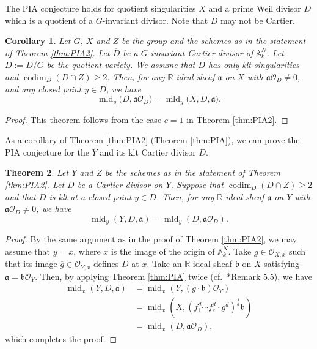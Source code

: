 \documentclass[a4paper,11pt]{amsart}
\newtheorem{thm}{Theorem}[section]
\newtheorem{cor}[thm]{Corollary}
\theoremstyle{definition}
\theoremstyle{remark}
\begin{document}
The PIA conjecture holds for quotient singularities $X$ and a prime Weil divisor $D$ which is a quotient of a $G$-invariant divisor. Note that $D$ may not be Cartier.
\begin{cor}\label{cor:PIA4}
Let $G$, $X$ and $Z$ be the group and the schemes as in the statement of Theorem \ref{thm:PIA2}. 
Let $\overline{D}$ be a $G$-invariant Cartier divisor of $\mathbb{A}_k^N$. 
Let $D := \overline{D}/ G$ be the quotient variety. 
We assume that $D$ has only klt singularities and $\operatorname{codim} _D (D \cap Z) \ge 2$. 
Then, for any $\mathbb{R}$-ideal sheaf $\mathfrak{a}$ on $X$ with $\mathfrak{a} \mathcal{O}_D \not = 0$, and any closed point $y \in D$, we have 
\[
\operatorname{mld}_y \bigl( D, \mathfrak{a}\mathcal{O}_D \bigr) = 
\operatorname{mld}_y \bigl( X, D, \mathfrak{a} \bigr). 
\]
\end{cor}
\begin{proof}
This theorem follows from the case $c = 1$ in Theorem \ref{thm:PIA2}.
\end{proof}

As a corollary of Theorem \ref{thm:PIA2} (Theorem \ref{thm:PIA}), we can prove the PIA conjecture for the $Y$ and its klt Cartier divisor $D$. 

\begin{thm}\label{thm:PIA3}
Let $Y$ and $Z$ be the schemes as in the statement of Theorem \ref{thm:PIA2}. 
Let $D$ be a Cartier divisor on $Y$. 
Suppose that $\operatorname{codim}_D (D \cap Z) \ge 2$ and that $D$ is klt at a closed point $y \in D$. 
Then, for any $\mathbb{R}$-ideal sheaf $\mathfrak{a}$ on $Y$ with $\mathfrak{a} \mathcal{O}_D \not = 0$, we have 
\[
\operatorname{mld}_y \left( Y,D, \mathfrak{a} \right) = 
\operatorname{mld}_y \left( D, \mathfrak{a} \mathcal{O}_D \right). 
\]
\end{thm}
\begin{proof}
By the same argument as in the proof of Theorem \ref{thm:PIA2}, we may assume that $y = x$, where $x$ is the image of the origin of $\mathbb{A}^N _k$. 
Take $g \in \mathcal{O}_{X, x}$ such that its image 
$\overline{g} \in \mathcal{O}_{Y, x}$ defines $D$ at $x$. 
Take an $\mathbb{R}$-ideal sheaf $\mathfrak{b}$ on $X$ satisfying $\mathfrak{a} = \mathfrak{b} \mathcal{O}_Y$.
Then, by applying Theorem \ref{thm:PIA} twice (cf.\ \cite{NS22}*{Remark 5.5}), we have
\begin{align*}
\operatorname{mld}_{x} \left( Y,D, \mathfrak{a} \right) 
&= 
\operatorname{mld}_{x} \left( Y, (g \cdot \mathfrak{b}) \mathcal{O}_Y  \right) \\
&=
\operatorname{mld}_{x} \left( X, (f_1^d \cdots f_{c}^d \cdot g^d)^{\frac{1}{d}}\mathfrak{b} \right) \\
&=
\operatorname{mld}_{x} ( D, \mathfrak{a} \mathcal{O}_D ), 
\end{align*}
which completes the proof. 
\end{proof}
\end{document}
